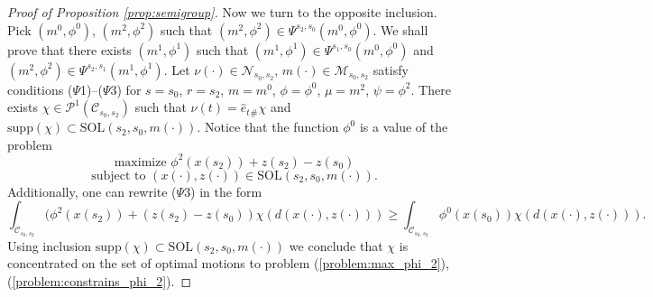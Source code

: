 \documentclass[a4paper,12pt]{article}
\begin{document}
\begin{proof}[Proof of Proposition \ref{prop:semigroup}]
	Now we turn to the opposite inclusion. Pick $(m^0,\phi^0)$, $(m^2,\phi^2)$ such that 
	$(m^2,\phi^2)\in\Psi^{s_2,s_0}(m^0,\phi^0)$. We shall prove that there exists $(m^1,\phi^1)$ such that
	$(m^1,\phi^1)\in\Psi^{s_1,s_0}(m^0,\phi^0)$ and $(m^2,\phi^2)\in\Psi^{s_2,s_1}(m^1,\phi^1)$. Let $\nu(\cdot)\in\mathcal{N}_{s_0,s_2}$, $m(\cdot)\in \mathcal{M}_{s_0,s_2}$ satisfy conditions ($\Psi$1)--($\Psi$3) for $s=s_0$, $r=s_2$, $m=m^0$, $\phi=\phi^0$, $\mu=m^2$, $\psi=\phi^2$. There exists $\chi\in \mathcal{P}^1(\mathcal{C}_{s_0,s_2})$  such that 
	$\nu(t)=\hat{e}_t{}_\#\chi $ and $\mathrm{supp}(\chi)\subset \mathrm{SOL}(s_2,s_0,m(\cdot))$. Notice that the function
	$\phi^0$ is a value  of the problem
	\begin{equation}\label{problem:max_phi_2}
	\text{maximize }\phi^2(x(s_2))+z(s_2)-z(s_0) 
	\end{equation}
	\begin{equation}\label{problem:constrains_phi_2}
	\text{subject to }(x(\cdot),z(\cdot))\in\mathrm{SOL}(s_2,s_0,m(\cdot)). 
	\end{equation} Additionally, one can rewrite ($\Psi$3) in the form
	$$\int_{\mathcal{C}_{s_0,s_2}}(\phi^2(x(s_2))+(z(s_2)-z(s_0))\chi(d(x(\cdot),z(\cdot)))\geq \int_{\mathcal{C}_{s_0,s_2}} \phi^0(x(s_0))\chi(d(x(\cdot),z(\cdot))). $$ Using inclusion $\mathrm{supp}(\chi)\subset \mathrm{SOL}(s_2,s_0,m(\cdot))$ we conclude that $\chi$ is concentrated on the set of optimal motions to  problem (\ref{problem:max_phi_2}), (\ref{problem:constrains_phi_2}).
	

\end{proof}
\end{document}
